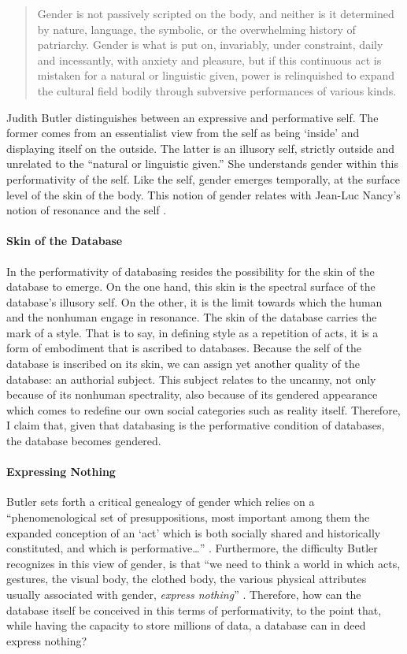 \begin{quote}
	Gender is not passively scripted on the body, and neither is it determined by nature, language, the symbolic, or the overwhelming history of patriarchy. Gender is what is put on, invariably, under constraint, daily and incessantly, with anxiety and pleasure, but if this continuous act is mistaken for a natural or linguistic given, power is relinquished to expand the cultural field bodily through subversive performances of various kinds. \parencite[531]{But88:Per}
\end{quote}

Judith Butler \parencite{But88:Per} distinguishes between an expressive and performative self. The former comes from an essentialist view from the self as being `inside' and displaying itself on the outside. The latter is an illusory self, strictly outside and unrelated to the ``natural or linguistic given.'' She understands gender within this performativity of the self. Like the self, gender emerges temporally, at the surface level of the skin of the body. This notion of gender relates with Jean-Luc Nancy's notion of resonance and the self .

\paragraph{Skin of the Database}
In the performativity of databasing resides the possibility for the skin of the database to emerge. On the one hand, this skin is the spectral surface of the database's illusory self. On the other, it is the limit towards which the human and the nonhuman engage in resonance. The skin of the database carries the mark of a style. That is to say, in defining style as a repetition of acts, it is a form of embodiment that is ascribed to databases. Because the self of the database is inscribed on its skin, we can assign yet another quality of the database: an authorial subject. This subject relates to the uncanny, not only because of its nonhuman spectrality, also because of its gendered appearance which comes to redefine our own social categories such as reality itself. Therefore, I claim that, given that databasing is the performative condition of databases, the database becomes gendered.  

\paragraph{Expressing Nothing}
Butler sets forth a critical genealogy of gender which relies on a ``phenomenological set of presuppositions, most important among them the expanded conception of an `act' which is both socially shared and historically constituted, and which is performative\dots'' \parencite[530]{But88:Per}. Furthermore, the difficulty Butler recognizes in this view of gender, is that ``we need to think a world in which acts, gestures, the visual body, the clothed body, the various physical attributes usually associated with gender, \textit{express nothing}'' \parencite[530]{But88:Per}. Therefore, how can the database itself be conceived in this terms of performativity, to the point that, while having the capacity to store millions of data, a database can in deed express nothing? 

